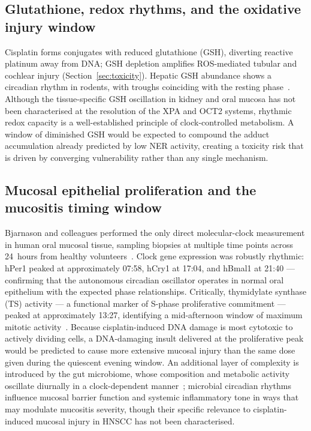 \documentclass[preprint,review,12pt]{elsarticle}
\begin{document}
\subsection{Glutathione, redox rhythms, and the oxidative injury window}

Cisplatin forms conjugates with reduced glutathione (GSH), diverting reactive
platinum away from DNA; GSH depletion amplifies ROS-mediated tubular and
cochlear injury (Section~\ref{sec:toxicity}).  Hepatic GSH abundance shows a
circadian rhythm in rodents, with troughs coinciding with the resting
phase~\cite{Li1997}.  Although the tissue-specific GSH oscillation in kidney
and oral mucosa has not been characterised at the resolution of the XPA and
OCT2 systems, rhythmic redox capacity is a well-established principle of
clock-controlled metabolism.  A window of diminished GSH would be expected to
compound the adduct accumulation already predicted by low NER activity, creating
a toxicity risk that is driven by converging vulnerability rather than any single
mechanism.

\subsection{Mucosal epithelial proliferation and the mucositis timing window}

Bjarnason and colleagues performed the only direct molecular-clock measurement
in human oral mucosal tissue, sampling biopsies at multiple time points across
24~hours from healthy volunteers~\cite{Bjarnason2001}.  Clock gene expression
was robustly rhythmic: hPer1 peaked at approximately 07:58, hCry1 at 17:04,
and hBmal1 at 21:40 --- confirming that the autonomous circadian oscillator
operates in normal oral epithelium with the expected phase relationships.
Critically, thymidylate synthase (TS) activity --- a functional marker of
S-phase proliferative commitment --- peaked at approximately 13:27, identifying
a mid-afternoon window of maximum mitotic activity~\cite{Bjarnason2001}.
Because cisplatin-induced DNA damage is most cytotoxic to actively dividing
cells, a DNA-damaging insult delivered at the proliferative peak would be
predicted to cause more extensive mucosal injury than the same dose given
during the quiescent evening window.  An additional layer of complexity is
introduced by the gut microbiome, whose composition and metabolic activity
oscillate diurnally in a clock-dependent manner~\cite{Thaiss2014}; microbial
circadian rhythms influence mucosal barrier function and systemic inflammatory
tone in ways that may modulate mucositis severity, though their specific
relevance to cisplatin-induced mucosal injury in HNSCC has not been
characterised.
\end{document}
